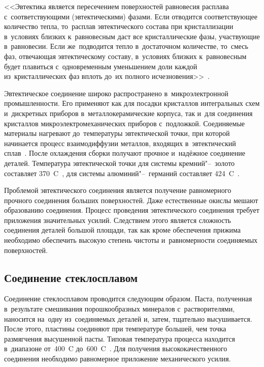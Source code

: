 <<Эвтектика является пересечением поверхностей равновесия расплава с~соответствующими (эвтектическими) фазами. Если отводится соответствующее количество тепла, то~расплав эвтектического состава при кристаллизации в~условиях близких к~равновесным даст все кристаллические фазы, участвующие в~равновесии. Если же~подводится тепло в~достаточном количестве, то~смесь фаз, отвечающая эвтектическому составу, в~условиях близких к~равновесным будет плавиться с~одновременным уменьшением доли каждой из~кристаллических фаз вплоть до~их полного исчезновения>>~\cite{wiki_eutectic}.

Эвтектическое соединение широко распространено в~микроэлектронной
промышленности.
Его применяют как для посадки кристаллов интегральных схем и~дискретных приборов
в~металлокерамические корпуса, так и~для соединения кристаллов
микроэлектромеханических приборов с~подложкой.
Соединяемые материалы нагревают до~температуры эвтектической точки, при которой
начинается процесс взаимодиффузии металлов, входящих в~эвтектический
сплав~\cite{Dragoi_cmos_wafer_bonding}.
После охлаждения сборки получают прочное и~надёжное соединение деталей.
Температура эвтектической точки для системы кремний"--~золото составляет
370~{\textdegree}C~\cites[396]{Ljakishev1996_diag_dvojnyh_met_sis_t1}, для
системы алюминий"--~германий составляет
424~{\textdegree}C~\cites[152]{Ljakishev1996_diag_dvojnyh_met_sis_t1}.

Проблемой эвтектического соединения является получение равномерного прочного соединения больших поверхностей. Даже естественные окислы мешают образованию соединения. Процесс проведения эвтектического соединения требует приложения значительных усилий. Следствием этого является сложность соединения деталей большой площади, так как кроме обеспечения прижима необходимо обеспечить высокую степень чистоты и~равномерности соединяемых поверхностей.

\subsection{Соединение стеклосплавом}
Соединение стеклосплавом проводится следующим образом. Паста, полученная в~результате смешивания порошкообразных минералов с~растворителями, наносится на~одну из~соединяемых деталей и, затем, тщательно высушивается. После этого, пластины соединяют при температуре большей, чем точка размягчения высушенной пасты. Типовая температура процесса находится в~диапазоне от~400~{\textdegree}C до~600~{\textdegree}C~\cite{stoger1999awbtech}. Для получения высококачественного соединения необходимо равномерное приложение механического усилия.

